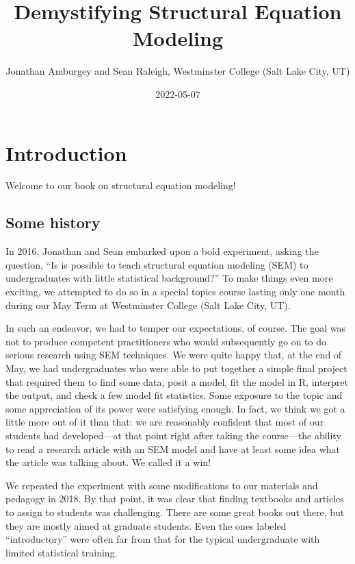\documentclass[
]{book}
\title{Demystifying Structural Equation Modeling}
\author{Jonathan Amburgey and Sean Raleigh, Westminster College (Salt Lake City, UT)}
\date{2022-05-07}
\begin{document}
\maketitle

{
\setcounter{tocdepth}{1}
\tableofcontents
}
\hypertarget{introduction}{%
\chapter*{Introduction}\label{introduction}}

Welcome to our book on structural equation modeling!

\hypertarget{some-history}{%
\section*{Some history}\label{some-history}}

In 2016, Jonathan and Sean embarked upon a bold experiment, asking the question, ``Is is possible to teach structural equation modeling (SEM) to undergraduates with little statistical background?'' To make things even more exciting, we attempted to do so in a special topics course lasting only one month during our May Term at Westminster College (Salt Lake City, UT).

In such an endeavor, we had to temper our expectations, of course. The goal was not to produce competent practitioners who would subsequently go on to do serious research using SEM techniques. We were quite happy that, at the end of May, we had undergraduates who were able to put together a simple final project that required them to find some data, posit a model, fit the model in R, interpret the output, and check a few model fit statistics. Some exposure to the topic and some appreciation of its power were satisfying enough. In fact, we think we got a little more out of it than that: we are reasonably confident that most of our students had developed---at that point right after taking the course---the ability to read a research article with an SEM model and have at least some idea what the article was talking about. We called it a win!

We repeated the experiment with some modifications to our materials and pedagogy in 2018. By that point, it was clear that finding textbooks and articles to assign to students was challenging. There are some great books out there, but they are mostly aimed at graduate students. Even the ones labeled ``introductory'' were often far from that for the typical undergraduate with limited statistical training.
\end{document}
